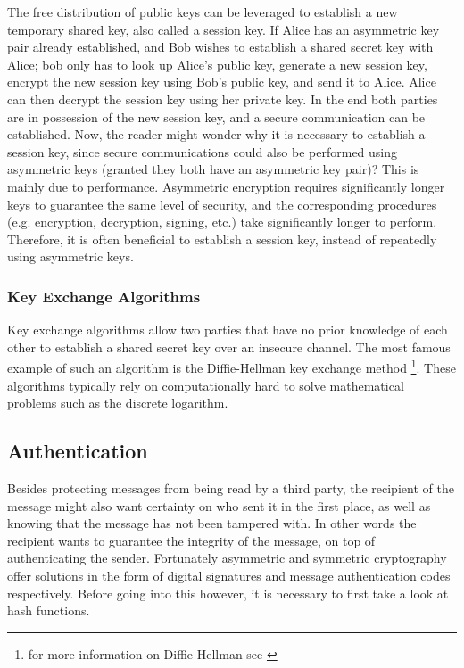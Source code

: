 The free distribution of public keys can be leveraged to establish a new temporary shared key, also called a session key. If Alice has an asymmetric key pair already established, and Bob wishes to establish a shared secret key with Alice; bob only has to look up Alice's public key, generate a new session key, encrypt the new session key using Bob's public key, and send it to Alice. Alice can then decrypt the session key using her private key. In the end both parties are in possession of the new session key, and a secure communication can be established. Now, the reader might wonder why it is necessary to establish a session key, since secure communications could also be performed using asymmetric keys (granted they both have an asymmetric key pair)? This is mainly due to performance. Asymmetric encryption requires significantly longer keys to guarantee the same level of security, and the corresponding procedures (e.g. encryption, decryption, signing, etc.) take significantly longer to perform. Therefore, it is often beneficial to establish a session key, instead of repeatedly using asymmetric keys.

\subsubsection{Key Exchange Algorithms} 
\label{subsec:key_exhange_algorithms}

Key exchange algorithms allow two parties that have no prior knowledge of each other to establish a shared secret key over an insecure channel. The most famous example of such an algorithm is the Diffie-Hellman key exchange method \footnote{for more information on Diffie-Hellman see \cite{wiki:DH}}. These algorithms typically rely on computationally hard to solve mathematical problems such as the discrete logarithm.

\subsection{Authentication} 
\label{sec:authentication}

Besides protecting messages from being read by a third party, the recipient of the message might also want certainty on who sent it in the first place, as well as knowing that the message has not been tampered with. In other words the recipient wants to guarantee the integrity of the message, on top of authenticating the sender. Fortunately asymmetric and symmetric cryptography offer solutions in the form of digital signatures and message authentication codes respectively. Before going into this however, it is necessary to first take a look at hash functions.


